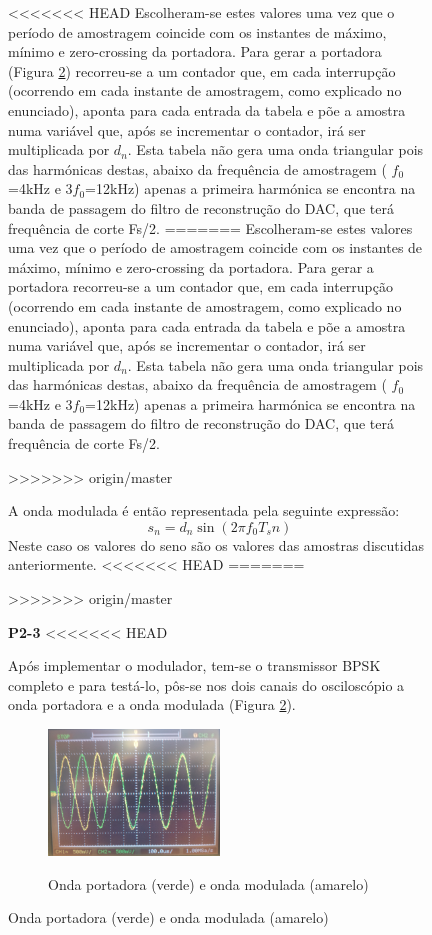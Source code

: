 \documentclass[11pt]{article}
\begin{document}
\begin{figure}[H]
<<<<<<< HEAD
Escolheram-se estes valores uma vez que o período de amostragem coincide com os instantes de máximo, mínimo e zero-crossing da portadora. Para gerar a portadora (Figura \ref{port_mod}) recorreu-se a um contador que, em cada interrupção (ocorrendo em cada instante de amostragem, como explicado no enunciado), aponta para cada entrada da tabela e põe a amostra numa variável que, após se incrementar o contador, irá ser multiplicada por $d_n$. Esta tabela não gera uma onda triangular pois das harmónicas destas, abaixo da frequência de amostragem ( $f_0$=4kHz e 3$f_0$=12kHz) apenas a primeira harmónica se encontra na banda de passagem do filtro de reconstrução do DAC, que terá frequência de corte Fs/2.
=======
Escolheram-se estes valores uma vez que o período de amostragem coincide com os instantes de máximo, mínimo e zero-crossing da portadora. Para gerar a portadora recorreu-se a um contador que, em cada interrupção (ocorrendo em cada instante de amostragem, como explicado no enunciado), aponta para cada entrada da tabela e põe a amostra numa variável que, após se incrementar o contador, irá ser multiplicada por $d_n$. Esta tabela não gera uma onda triangular pois das harmónicas destas, abaixo da frequência de amostragem ( $f_0$=4kHz e 3$f_0$=12kHz) apenas a primeira harmónica se encontra na banda de passagem do filtro de reconstrução do DAC, que terá frequência de corte Fs/2.

>>>>>>> origin/master

A onda modulada é então representada pela seguinte expressão:
\begin{equation}
	s_n= d_n \sin(2 \pi f_0T_sn) 
\end{equation}
Neste caso os valores do seno são os valores das amostras discutidas anteriormente.
<<<<<<< HEAD
=======

>>>>>>> origin/master
\vspace{2 mm}

\textbf{P2-3}
<<<<<<< HEAD

Após implementar o modulador, tem-se o transmissor BPSK completo e para testá-lo, pôs-se nos dois canais do osciloscópio a onda portadora e a onda modulada (Figura \ref{port_mod}).

\begin{figure}[H]
	\centering
	\includegraphics[width=0.5\textwidth]{./port_mod}~\\
	\caption{Onda portadora (verde) e onda modulada (amarelo)}
	\label{port_mod}
\end{figure}


\end{figure}
\end{document}
